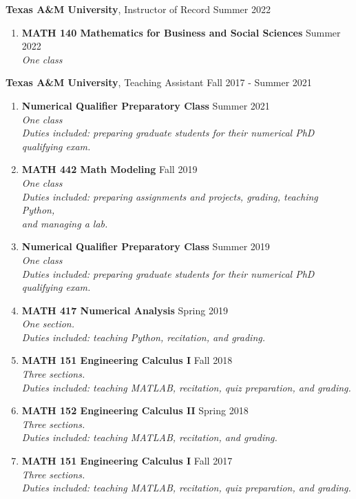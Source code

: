 \documentclass[letterpaper,10pt]{article}
\begin{document}
\large{\textbf{Texas A\&M University}, Instructor of Record
	\hfill Summer 2022

\normalsize

\begin{enumerate}
\item[] \textbf{MATH 140 Mathematics for Business and Social
	Sciences} \hfill Summer 2022 \\ \textit{One class}
\end{enumerate}

\large{\textbf{Texas A\&M University}, Teaching Assistant
\hfill Fall 2017 - Summer 2021} \\

\normalsize

\begin{enumerate}
\item[] \textbf{Numerical Qualifier Preparatory Class} \hfill Summer 2021 \\
\textit{One class} \\
\textit{Duties included: preparing graduate students for their numerical PhD qualifying exam.}
\item[] \textbf{MATH 442 Math Modeling} \hfill Fall 2019 \\
\textit{One class} \\
\textit{Duties included: preparing assignments and projects, grading, teaching Python, \\ and managing a lab.}
\item[] \textbf{Numerical Qualifier Preparatory Class} \hfill Summer 2019 \\
\textit{One class} \\
\textit{Duties included: preparing graduate students for their numerical PhD qualifying exam.}
\item[] \textbf{MATH 417 Numerical Analysis} \hfill Spring 2019 \\
\textit{One section.} \\
\textit{Duties included: teaching Python, recitation, and grading.}
\item[] \textbf{MATH 151 Engineering Calculus I} \hfill Fall 2018 \\
\textit{Three sections.} \\
\textit{Duties included: teaching MATLAB, recitation, quiz preparation, and grading.}
\item[] \textbf{MATH 152 Engineering Calculus II} \hfill Spring 2018 \\
\textit{Three sections.} \\
\textit{Duties included: teaching MATLAB, recitation, and grading.}
\item[] \textbf{MATH 151 Engineering Calculus I} \hfill Fall 2017 \\
\textit{Three sections.} \\
\textit{Duties included: teaching MATLAB, recitation, quiz preparation, and grading.}
\end{enumerate}

}
\end{document}
